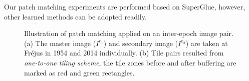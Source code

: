 Our patch matching experiments are performed based on SuperGlue, however, other learned methods can be adopted readily. \\

\begin{figure}[htbp]
	\begin{center}
		\caption{Illustration of patch matching applied on an inter-epoch image pair. (a) The master image ($I^{e_1}$) and secondary image ($I^{e_2}$) are taken at Fr{\'e}jus in 1954 and 2014 individually. (b) Tile pairs resulted from \textit{one-to-one tiling scheme}, the tile zones before and after buffering are marked as red and green rectangles.}
		\label{patchexample}
	\end{center}
\end{figure}

